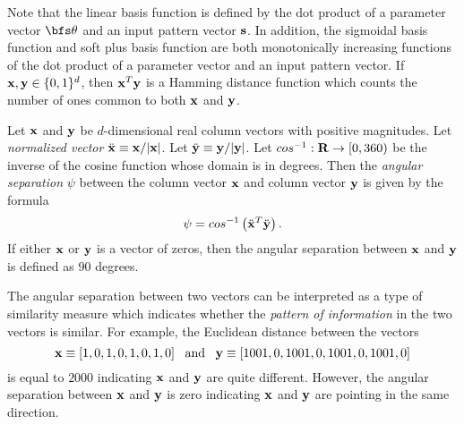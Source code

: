 Note that the linear basis function is defined by the dot product of a parameter vector
${\bfs \theta}$ and an input pattern vector ${\bf s}$. In addition, the sigmoidal
basis function and soft plus basis function are both monotonically increasing functions
of the dot product of a parameter vector and an input pattern vector. If
${\bf x}, {\bf y} \in \{0,1\}^d$, then ${\bf x}^T {\bf y}$ is a Hamming distance function
which counts the number of ones
common to both ${\bf x}$ and ${\bf y}$.

\begin{definition}
Let ${\bf x}$ and ${\bf y}$ be $d$-dimensional real column vectors with positive magnitudes.
Let {\em normalized vector} $\ddot{\bf x} \equiv {\bf x}/|{\bf x}|$.
Let $\ddot{\bf y} \equiv {\bf y}/|{\bf y}|$.
Let $cos^{-1} : {\bf R} \rightarrow [0,360)$ be the inverse of the cosine function whose
domain is in degrees. Then the {\em angular separation} $\psi$ between the column vector ${\bf x}$ and
column vector ${\bf y}$ is given by the formula
\begin{displaymath}
\psi = cos^{-1} \left( \ddot{\bf x}^T \ddot{\bf y} \right).
\end{displaymath}
If either ${\bf x}$ or ${\bf y}$ is a vector of zeros, then the angular separation
between ${\bf x}$ and ${\bf y}$ is defined as $90$ degrees.
\end{definition}

The angular separation between two vectors can be interpreted as a type of similarity measure
which indicates whether the {\em pattern of information} in the two vectors is similar.
For example, the Euclidean distance between the vectors 
\begin{displaymath}
{\bf x} \equiv [1,0,1,0,1,0,1,0] \;\;\; \text{and} \;\;\;
{\bf y} \equiv [1001,0,1001,0,1001,0,1001,0]
\end{displaymath}
is equal to $2000$ indicating ${\bf x}$ and ${\bf y}$ are quite different. However,
the angular separation 
between ${\bf x}$ and ${\bf y}$
is zero indicating ${\bf x}$ and ${\bf y}$ are pointing in the same direction.

